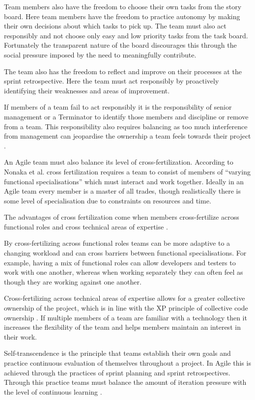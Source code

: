 \documentclass[conference]{IEEEtran}
\begin{document}
Team members also have the freedom to choose their own tasks from the story
board. Here team members have the freedom to practice autonomy by making their
own decisions about which tasks to pick up. The team must also act responsibly
and not choose only easy and low priority tasks from the task board. Fortunately
the transparent nature of the board discourages this through the social pressure
imposed by the need to meaningfully contribute.

The team also has the freedom to reflect and improve on their processes at the
sprint retrospective. Here the team must act responsibly by proactively
identifying their weaknesses and areas of improvement.

If members of a team fail to act responsibly it is the responsibility of senior
management or a Terminator \cite{hoda2010organizing} to identify those members
and discipline or remove from a team. This responsibility also requires
balancing as too much interference from management can jeopardise the ownership
a team feels towards their project \cite{hoda2010balancing}.

An Agile team must also balance its level of cross-fertilization. According to
Nonaka et al. cross fertilization requires a team to consist of members of
``varying functional specialisations'' which must interact and work together.
Ideally in an Agile team every member is a master of all trades, though
realistically there is some level of specialisation due to constraints on
resources and time.

The advantages of cross fertilization come when members cross-fertilize across
functional roles and cross technical areas of expertise
\cite{hoda2010balancing}.

By cross-fertilizing across functional roles teams can be more adaptive to a
changing workload and can cross barriers between functional specialisations. For
example, having a mix of functional roles can allow developers and testers to
work with one another, whereas when working separately they can often feel as
though they are working against one another.

Cross-fertilizing across technical areas of expertise allows for a greater
collective ownership of the project, which is in line with the XP principle of
collective code ownership \cite{beck1999embracing}. If multiple members of a
team are familiar with a technology then it increases the flexibility of the
team and helps members maintain an interest in their work.

Self-transcendence is the principle that teams establish their own goals and
practice continuous evaluation of themselves throughout a project. In Agile this
is achieved through the practices of sprint planning and sprint retrospectives.
Through this practice teams must balance the amount of iteration pressure with
the level of continuous learning \cite{hoda2010balancing}.
\end{document}
